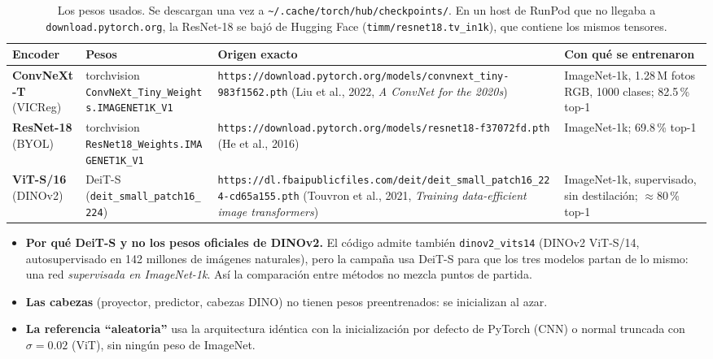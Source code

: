 \documentclass[11pt,a4paper]{article}
\begin{document}
\begin{table}[H]
\centering
\small
\begin{tabularx}{\textwidth}{l>{\raggedright\arraybackslash}p{3.2cm}>{\raggedright\arraybackslash}X>{\raggedright\arraybackslash}p{3.6cm}}
\toprule
Encoder & Pesos & Origen exacto & Con qué se entrenaron \\
\midrule
\textcolor{vicregc}{\textbf{ConvNeXt-T}} (VICReg) & torchvision \nolinkurl{ConvNeXt_Tiny_Weights.IMAGENET1K_V1} &
  \nolinkurl{https://download.pytorch.org/models/convnext_tiny-983f1562.pth} (Liu et al., 2022, \emph{A ConvNet for the 2020s}) &
  ImageNet-1k, 1.28\,M fotos RGB, 1000 clases; 82.5\,\% top-1 \\
\textcolor{byolc}{\textbf{ResNet-18}} (BYOL) & torchvision \nolinkurl{ResNet18_Weights.IMAGENET1K_V1} &
  \nolinkurl{https://download.pytorch.org/models/resnet18-f37072fd.pth} (He et al., 2016) &
  ImageNet-1k; 69.8\,\% top-1 \\
\textcolor{dinoc}{\textbf{ViT-S/16}} (DINOv2) & DeiT-S (\nolinkurl{deit_small_patch16_224}) &
  \nolinkurl{https://dl.fbaipublicfiles.com/deit/deit_small_patch16_224-cd65a155.pth} (Touvron et al., 2021, \emph{Training data-efficient image transformers}) &
  ImageNet-1k, supervisado, sin destilación; $\approx$80\,\% top-1 \\
\bottomrule
\end{tabularx}
\caption{Los pesos usados. Se descargan una vez a \texttt{\textasciitilde/.cache/torch/hub/checkpoints/}.
En un host de RunPod que no llegaba a \texttt{download.pytorch.org}, la ResNet-18 se bajó de Hugging
Face (\texttt{timm/resnet18.tv\_in1k}), que contiene los mismos tensores.}
\label{tab:weights}
\end{table}

\begin{itemize}
\item \textbf{Por qué DeiT-S y no los pesos oficiales de DINOv2.} El código admite también
  \texttt{dinov2\_vits14} (DINOv2 ViT-S/14, autosupervisado en 142 millones de imágenes
  naturales), pero la campaña usa DeiT-S para que los tres modelos partan de lo mismo: una red
  \emph{supervisada en ImageNet-1k}. Así la comparación entre métodos no mezcla puntos de partida.
\item \textbf{Las cabezas} (proyector, predictor, cabezas DINO) no tienen pesos preentrenados: se
  inicializan al azar.
\item \textbf{La referencia ``aleatoria''} usa la arquitectura idéntica con la inicialización por
  defecto de PyTorch (CNN) o normal truncada con $\sigma=0.02$ (ViT), sin ningún peso de ImageNet.
\end{itemize}
\end{document}
